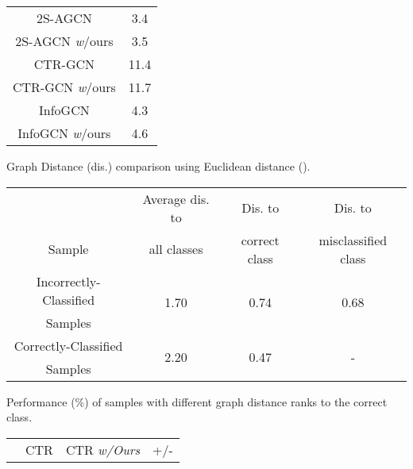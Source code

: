 \documentclass{article} \usepackage{iclr2023_conference,times}
\begin{document}
\begin{minipage}{\textwidth}
\begin{minipage}[t]{0.43\textwidth}
\begin{tabular}{c||c}
       \hline \hline
        2S-AGCN & 3.4 \\
        2S-AGCN \textit{w}/ours & 3.5 \color{red}{ 2.9\%} \\\hline
        CTR-GCN & 11.4  \\
        CTR-GCN \textit{w}/ours & 11.7 \color{red}{ 2.6\%} \\\hline
        InfoGCN & 4.3 \\
        InfoGCN \textit{w}/ours & 4.6 \color{red}{ 7.0\%} \\
        \hline
    \end{tabular}
    \label{table:train comsumption}
\end{minipage}

\begin{minipage}[t]{0.5\textwidth}
\centering
\setlength\tabcolsep{1pt}
\makeatletter{}
\setlength\tabcolsep{2.5pt}
   \scriptsize
   \caption{Graph Distance (dis.) comparison using Euclidean distance ().}
    \begin{tabular}{c||c||c||c}
\cellcolor{gray!30} & \cellcolor{gray!30} Average dis. to & \cellcolor{gray!30} Dis. to & \cellcolor{gray!30} Dis. to \\
        \multirow{-2}{*}{\cellcolor{gray!30} Sample} & \cellcolor{gray!30} all classes & \cellcolor{gray!30} correct class & \cellcolor{gray!30} misclassified class \\
       \hline \hline
        Incorrectly-Classified & \multirow{2}{*}{1.70} & \multirow{2}{*}{0.74} & \multirow{2}{*}{0.68} \\
        Samples & & & \\\hline
Correctly-Classified & \multirow{2}{*}{2.20} & \multirow{2}{*}{0.47} & \multirow{2}{*}{-} \\
Samples & & & \\
        \hline
    \end{tabular}
    \label{table:Graph Distance}
\end{minipage}
\hspace{0.5cm}
\begin{minipage}[t]{0.5\textwidth}
\centering
\setlength\tabcolsep{2pt}
\makeatletter{}
\setlength\tabcolsep{2.5pt}
   \scriptsize
   \caption{Performance (\%) of samples with different graph distance ranks to the correct class.}
    \begin{tabular}{c||c||c||c}
\rowcolor{gray!30} & CTR & CTR \textit{w/Ours} & +/- \\

\end{tabular}
\end{minipage}
\end{minipage}
\end{document}
